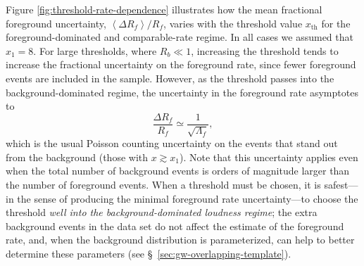 \documentclass[aps,prd,reprint,nofootinbib]{revtex4-1}
\begin{document}
Figure \ref{fig:threshold-rate-dependence} illustrates how the mean
fractional foreground uncertainty, $\left\langle \Delta R_f
\right\rangle / R_f$, varies with the threshold value $x_\mathrm{th}$
for the foreground-dominated and comparable-rate regime.  In all cases
we assumed that $x_1 = 8$.  For large thresholds, where $R_b \ll 1$,
increasing the threshold tends to increase the fractional uncertainty
on the foreground rate, since fewer foreground events are included in
the sample.  However, as the threshold passes into the
background-dominated regime, the uncertainty in the foreground rate
asymptotes to
\begin{equation}
  \frac{\Delta R_f}{R_f} \simeq \frac{1}{\sqrt{\Lambda_f}},
\end{equation}
which is the usual Poisson counting uncertainty on the events that
stand out from the background (those with $x \gtrsim x_1$).  Note that
this uncertainty applies even when the total number of background
events is orders of magnitude larger than the number of foreground
events.  When a threshold must be chosen, it is safest---in the sense
of producing the minimal foreground rate uncertainty---to choose the
threshold \emph{well into the background-dominated loudness regime};
the extra background events in the data set do not affect the estimate
of the foreground rate, and, when the background distribution is
parameterized, can help to better determine these parameters (see
\S~\ref{sec:gw-overlapping-template}).
\end{document}
